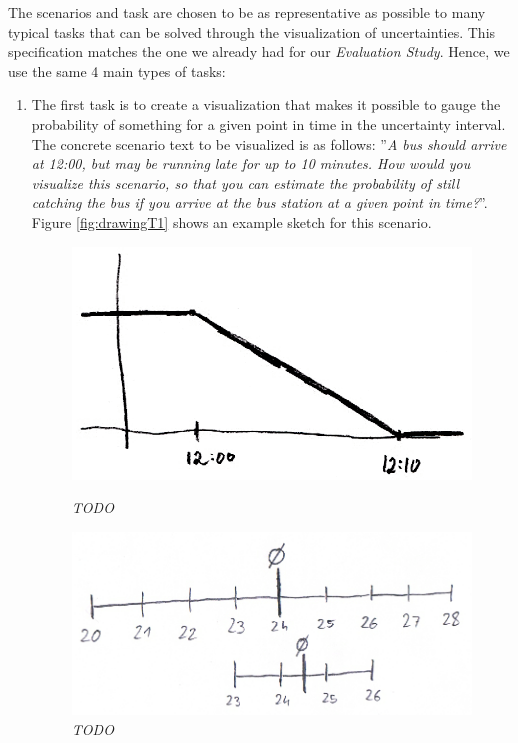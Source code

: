 The scenarios and task are chosen to be as representative as possible to many typical tasks that can be solved through the visualization of uncertainties. This specification matches the one we already had for our \textit{Evaluation Study}. Hence, we use the same 4 main types of tasks:
\begin{enumerate}
	\item The first task is to create a visualization that makes it possible to gauge the probability of something for a given point in time in the uncertainty interval. The concrete scenario text to be visualized is as follows: ''\textit{A bus should arrive at 12:00, but may be running late for up to 10 minutes. How would you visualize this scenario, so that you can estimate the probability of still catching the bus if you arrive at the bus station at a given point in time?}''. Figure \ref{fig:drawingT1} shows an example sketch for this scenario.
	
	\begin{figure}[H]
		\begin{minipage}{.45\textwidth}
			\centering
			\captionsetup{width=0.8\textwidth}
			\includegraphics[height=0.5\textwidth]{figures/drawingT1.png}
			\caption{\textit{TODO}}
			\label{fig:drawingT1}
		\end{minipage}
		\begin{minipage}{.45\textwidth}
			\centering
			\captionsetup{width=0.8\textwidth}
			\includegraphics[height=0.5\textwidth]{figures/drawingT2.png}
			\caption{\textit{TODO}}
			\label{fig:drawingT2}
		\end{minipage}
	\end{figure}
	

\end{enumerate}
